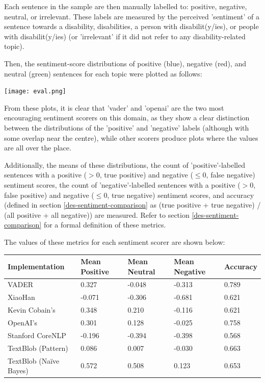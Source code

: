 \documentclass{report}
\begin{document}
Each sentence in the sample are then manually labelled to: positive, negative, neutral, or irrelevant.
These labels are measured by the perceived 'sentiment' of a sentence towards a disability, disabilities, a person with disabilit(y/ies), or people with disabilit(y/ies) (or 'irrelevant' if it did not refer to any disability-related topic).

Then, the sentiment-score distributions of positive (blue), negative (red), and neutral (green) sentences for each topic were plotted as follows:

\noindent
\texttt{[image: eval.png]}

From these plots, it is clear that 'vader' and 'openai' are the two most encouraging sentiment scorers on this domain, as they show a clear distinction between the distributions of the 'positive' and 'negative' labels (although with some overlap near the centre), while other scorers produce plots where the values are all over the place. %

Additionally, the means of these distributions, the count of 'positive'-labelled sentences with a positive ($>$0, true positive) and negative ($\le$0, false negative) sentiment scores, the count of 'negative'-labelled sentences with a positive ($>$0, false positive) and negative ($\le$0, true negative) sentiment scores, and accuracy (defined in section \ref{des-sentiment-comparison} as (true positive + true negative) / (all positive + all negative)) are measured.
Refer to section \ref{des-sentiment-comparison} for a formal definition of these metrics.

The values of these metrics for each sentiment scorer are shown below: 

\vspace{0.5em}
\noindent
\begin{tabu} to 1.0\textwidth { | X[c] | X[c] | X[c] | X[c] | X[c] | }
	\hline
	Implementation & Mean Positive & Mean Neutral & Mean Negative & Accuracy \\
	\hline
	VADER \cite{VADER} & 0.327 & -0.048 & -0.313 & 0.789 \\
	\hline
	XiaoHan \cite{kalchbrennerACL2014} & -0.071 & -0.306 & -0.681 & 0.621 \\
	\hline
	Kevin Cobain's \cite{kevincobain} & 0.348 & 0.210 & -0.116 & 0.621 \\
	\hline
	OpenAI's \cite{OpenAI} & 0.301 & 0.128 & -0.025 & 0.758 \\
	\hline
	Stanford CoreNLP \cite{StanfordNLP} & -0.196 & -0.394 & -0.398 & 0.568 \\
	\hline
	TextBlob \cite{textblob} (Pattern) & 0.086 & 0.007 & -0.030 & 0.663 \\
	\hline
	TextBlob \cite{textblob} (Na\"{i}ve Bayes) & 0.572 & 0.508 & 0.123 & 0.653 \\
	\hline
\end{tabu}
\end{document}
